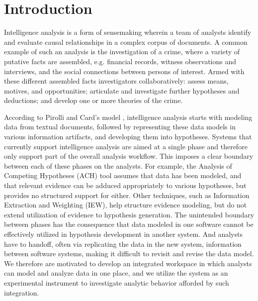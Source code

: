 \section{Introduction}\label{introduction}

Intelligence analysis is a form of sensemaking wherein a team of analysts
identify and evaluate causal relationships in a complex corpus of documents. A
common example of such an analysis is the investigation of a crime, where a variety of putative facts are assembled, e.g.
financial records, witness observations and interviews, and the social
connections between persons of interest. Armed with these different assembled facts
 investigators collaboratively: assess means, motives,
and opportunities; articulate and investigate further hypotheses and deductions;
and develop one or more theories of the crime.


According to Pirolli and Card's model \cite{Pirolli2005}, intelligence analysis
starts with modeling data from textual documents, followed by representing these
data models in various information artifacts, and developing them into
hypotheses.  Systems that currently support intelligence analysis are aimed at a
single phase and therefore only support part of the overall analysis workflow.
This imposes a clear boundary between each of these phases on the analysts. For
example, the Analysis of Competing Hypotheses (ACH) tool assumes that data has
been modeled, and that relevant evidence can be adduced appropriately to various
hypotheses, but provides no structured support for either. Other techniques,
such as Information Extraction and Weighting (IEW), help structure evidence
modeling, but do not extend utilization of evidence to hypothesis generation.
The unintended boundary between phases has the consequence that data modeled in
one software cannot be effectively utilized in hypothesis development in another
system. And analysts have to handoff, often via replicating the data in the new
system, information between software systems, making it difficult to revisit and
revise the data model. We therefore are motivated to develop an integrated
workspace in which analysts can model and analyze data in one place, and we
utilize the system as an experimental instrument to investigate analytic
behavior afforded by such integration.

